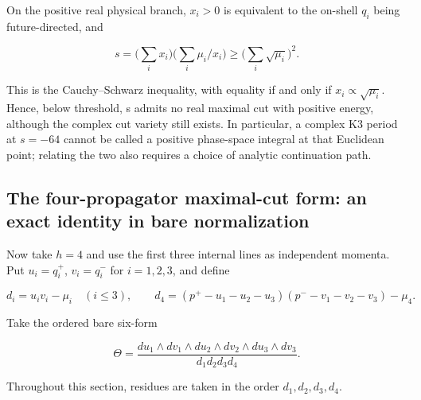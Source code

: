 \documentclass[11pt,a4paper,oneside]{article}
\theoremstyle{plain}
\theoremstyle{definition}
\theoremstyle{remark}
\numberwithin{equation}{section}
\begin{document}
On the positive real physical branch, \(x_i>0\) is equivalent to the on-shell \(q_i\) being future-directed, and

\begin{equation}
s=\Big(\sum_i x_i\Big)\Big(\sum_i\mu_i/x_i\Big)
          \geq\Big(\sum_i\sqrt{\mu_i}\Big)^2.          \label{eq:cut:6.4}
\end{equation}

This is the Cauchy--Schwarz inequality, with equality if and only if \(x_i\propto\sqrt{\mu_i}\). Hence, below threshold, s admits no real maximal cut with positive energy, although the complex cut variety still exists. In particular, a complex K3 period at \(s=- 64\) cannot be called a positive phase-space integral at that Euclidean point; relating the two also requires a choice of analytic continuation path.


\subsection{The four-propagator maximal-cut form: an exact identity in bare normalization}\label{sec:cut:7}

Now take \(h=4\) and use the first three internal lines as independent momenta. Put \(u_i=q_i^+\), \(v_i=q_i^-\) for \(i=1,2,3\), and define

\begin{equation}
d_i=u_iv_i-\mu_i\quad(i\leq3),\qquad
 d_4=(p^+-u_1-u_2-u_3)(p^--v_1-v_2-v_3)-\mu_4.
\end{equation}

Take the ordered bare six-form

\begin{equation}
\Theta=\frac{du_1\wedge dv_1\wedge du_2\wedge dv_2
                          \wedge du_3\wedge dv_3}
                         {d_1d_2d_3d_4}.              \label{eq:cut:7.1}
\end{equation}

Throughout this section, residues are taken in the order \(d_1,d_2,d_3,d_4\).
\end{document}
